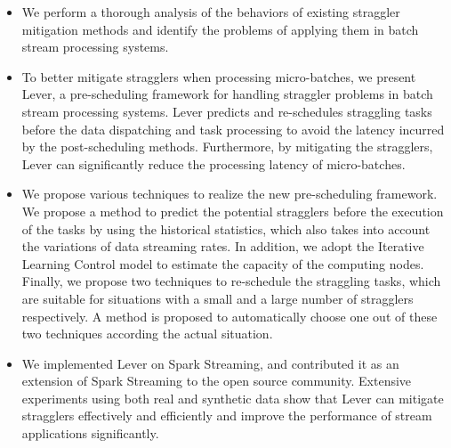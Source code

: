 \begin{itemize}
  \item We perform a thorough analysis of the behaviors of existing straggler
	mitigation methods and identify the problems of applying them in batch
	stream processing systems. 

  \item To better mitigate stragglers when processing micro-batches, we present
	Lever, a pre-scheduling framework for handling straggler problems in batch
	stream processing systems. Lever predicts and re-schedules straggling tasks 
	before the data dispatching and task processing to avoid the latency
	incurred by the post-scheduling methods. Furthermore, by mitigating the
	stragglers, Lever can significantly reduce the processing latency of
	micro-batches.

  \item We propose various techniques to realize the new pre-scheduling
	framework. We propose a method to predict the potential stragglers before the
	execution of the tasks by using the historical statistics, which also takes
	into account the variations of data streaming rates. In addition, we adopt
	the Iterative Learning Control model to estimate the capacity of the
	computing nodes. Finally, we propose two techniques to re-schedule the
	straggling tasks, which are suitable for situations with a small and a large
	number of stragglers respectively. A method is proposed to automatically
	choose one out of these two techniques according the actual situation.

  \item We implemented Lever on Spark Streaming, and contributed it as
	an extension of Spark Streaming to the open source community. Extensive
	experiments using both real and synthetic data show that Lever can mitigate
	stragglers effectively and efficiently and improve the performance of stream
	applications significantly.  

\end{itemize}

